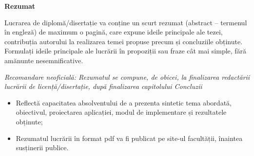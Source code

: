 \newpage
\begin{center}
    \LARGE
    \textbf{\thesistitle}
    
    \vspace{0.5cm}
    
    \authornamefl
    
    \vspace{1cm}
    
    \textbf{Rezumat}
    
    \vspace{1cm}
\end{center}


Lucrarea de diplomă/disertație va conține un scurt rezumat (abstract – termenul în engleză) de maximum o pagină, care expune ideile principale ale tezei, contribuția autorului la realizarea temei propuse precum și concluziile obținute. Formulați ideile principale ale lucrării în propoziții sau fraze cât mai simple, fără amănunte nesemnificative.

\textit{Recomandare neoficială: Rezumatul se compune, de obicei, la finalizarea redactării lucrării de licență/disertație, după finalizarea capitolului Concluzii}

\begin{itemize}
    \item Reflectă capacitatea absolventului de a prezenta sintetic tema abordată, obiectivul,
    proiectarea aplicației, modul de implementare și rezultatele obținute;
    \item Rezumatul lucrării în format pdf va fi publicat pe site-ul facultății, înaintea susținerii publice.
\end{itemize}